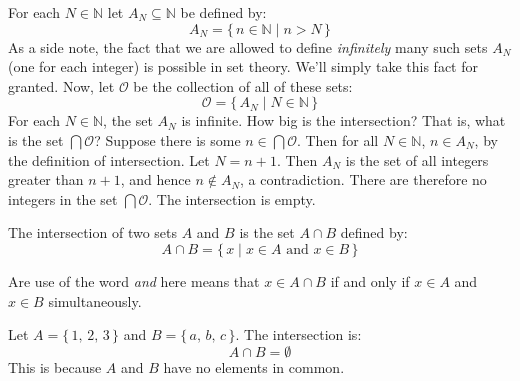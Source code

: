             \begin{example}
                For each $N\in\mathbb{N}$ let $A_{N}\subseteq\mathbb{N}$ be
                defined by:
                \begin{equation}
                    A_{N}=\{\,n\in\mathbb{N}\;|\;n>N\,\}
                \end{equation}
                As a side note, the fact that we are allowed to define
                \textit{infinitely} many such sets $A_{N}$ (one for each
                integer) is possible in set theory. We'll simply take this
                fact for granted. Now, let $\mathcal{O}$ be the collection
                of all of these sets:
                \begin{equation}
                    \mathcal{O}=\{\,A_{N}\;|\;N\in\mathbb{N}\,\}
                \end{equation}
                For each $N\in\mathbb{N}$, the set $A_{N}$ is infinite.
                How big is the intersection? That is, what is the set
                $\bigcap\mathcal{O}$? Suppose there is some
                $n\in\bigcap\mathcal{O}$. Then for all $N\in\mathbb{N}$,
                $n\in{A}_{N}$, by the definition of intersection.
                Let $N=n+1$. Then $A_{N}$ is the set of all integers
                greater than $n+1$, and hence $n\notin{A}_{N}$, a
                contradiction. There are therefore no integers in the
                set $\bigcap\mathcal{O}$. The intersection is empty.
            \end{example}
            \begin{definition}
                The intersection of two sets $A$ and $B$ is the set
                $A\cap{B}$ defined by:
                \begin{equation}
                    A\cap{B}=\{\,x\;|\;x\in{A}\textrm{ and }x\in{B}\,\}
                \end{equation}
            \end{definition}
            Are use of the word \textit{and} here means that
            $x\in{A}\cap{B}$ if and only if $x\in{A}$ and $x\in{B}$
            simultaneously.
            \begin{example}
                Let $A=\{\,1,\,2,\,3\,\}$ and $B=\{\,a,\,b,\,c\,\}$. The
                intersection is:
                \begin{equation}
                    A\cap{B}=\emptyset
                \end{equation}
                This is because $A$ and $B$ have no elements in common.
            \end{example}
